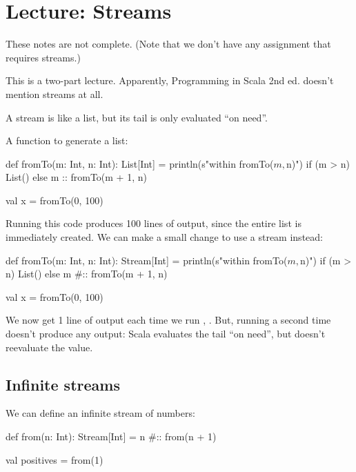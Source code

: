 \chapter{Lecture: Streams}
\startlecture

\begin{instructor}
These notes are not complete. (Note that we don't have any assignment that requires streams.)

This is a two-part lecture.
Apparently, Programming in Scala 2nd ed. doesn't mention streams at all. 
\end{instructor}

A stream is like a list, but its tail is only evaluated ``on need''.

A function to generate a list:

\begin{scalacode}
def fromTo(m: Int, n: Int): List[Int] = {
  println(s"within fromTo($m, $n)")
  if (m > n) {
    List()
  }
  else {
    m :: fromTo(m + 1, n)
  }
}

val x = fromTo(0, 100)
\end{scalacode}

Running this code produces 100 lines of output, since the entire list is
immediately created. We can make a small change to use a stream instead:

\begin{scalacode}
def fromTo(m: Int, n: Int): Stream[Int] = {
  println(s"within fromTo($m, $n)")
  if (m > n) {
    List()
  }
  else {
    m #:: fromTo(m + 1, n)
  }
}

val x = fromTo(0, 100)
\end{scalacode}

We now get 1 line of output each time we run , .
But, running  a second time doesn't produce any output: Scala evaluates
the tail ``on need'', but doesn't reevaluate the value.

\section{Infinite streams}

We can define an infinite stream of numbers:

\begin{scalacode}
def from(n: Int): Stream[Int] = n #:: from(n + 1)

val positives = from(1)
\end{scalacode}

